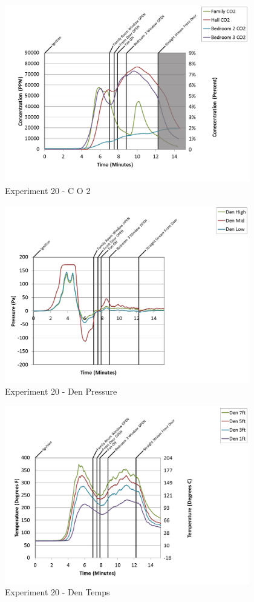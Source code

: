 \documentclass{article}
\begin{document}
\begin{appendices}
\clearpage

\begin{figure}[h!]
	\centering
	\includegraphics[height=3.05in]{0_Images/Results_Charts/Exp_20_Charts/CO2.png}
	\caption{Experiment 20 - C O 2}
\end{figure}


\begin{figure}[h!]
	\centering
	\includegraphics[height=3.05in]{0_Images/Results_Charts/Exp_20_Charts/DenPressure.png}
	\caption{Experiment 20 - Den Pressure}
\end{figure}

\clearpage

\begin{figure}[h!]
	\centering
	\includegraphics[height=3.05in]{0_Images/Results_Charts/Exp_20_Charts/DenTemps.png}
	\caption{Experiment 20 - Den Temps}
\end{figure}



\end{appendices}
\end{document}
